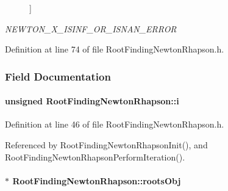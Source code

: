 \begin{Desc}
\begin{description}
{\label{structRootFindingNewtonRhapson_56625414af1ba2259e7d45af1b9130e4494e7dee03b5256e5dce2801e0f1651b}
}]\item[{\em 
\hypertarget{structRootFindingNewtonRhapson_56625414af1ba2259e7d45af1b9130e4a4cbeeef7b383bc9331558995a30651c}{
NEWTON\_\-X\_\-ISINF\_\-OR\_\-ISNAN\_\-ERROR}
\label{structRootFindingNewtonRhapson_56625414af1ba2259e7d45af1b9130e4a4cbeeef7b383bc9331558995a30651c}
}]\end{description}
\end{Desc}



Definition at line 74 of file RootFindingNewtonRhapson.h.

\subsubsection{Field Documentation}
\hypertarget{structRootFindingNewtonRhapson_3308e933e977d0303aca70f073cb6338}{
\paragraph[i]{\setlength{\rightskip}{0pt plus 5cm}unsigned {\bf RootFindingNewtonRhapson::i}}\hfill}
\label{structRootFindingNewtonRhapson_3308e933e977d0303aca70f073cb6338}




Definition at line 46 of file RootFindingNewtonRhapson.h.

Referenced by RootFindingNewtonRhapsonInit(), and RootFindingNewtonRhapsonPerformIteration().\hypertarget{structRootFindingNewtonRhapson_70f35799dc3717d1c54e4ba3f6699bd0}{
\paragraph[rootsObj]{$\ast$ {\bf RootFindingNewtonRhapson::rootsObj}}\hfill}
\label{structRootFindingNewtonRhapson_70f35799dc3717d1c54e4ba3f6699bd0}




